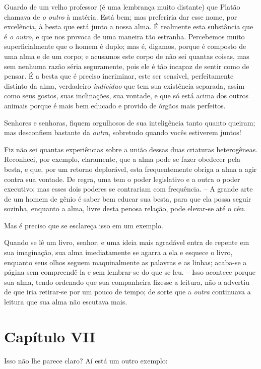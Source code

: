  Guardo de um velho professor (é uma lembrança muito distante) que
Platão chamava de \textit{o outro} à matéria. Está bem; mas preferiria
dar esse nome, por excelência, à besta que está junto a nossa alma. É
realmente esta substância que é \textit{o outro}, e que nos provoca de
uma maneira tão estranha. Percebemos muito superficialmente que o homem
é duplo; mas é, digamos, porque é composto de uma alma e de um corpo; e
acusamos este corpo de não sei quantas coisas, mas sem nenhuma razão
séria seguramente, pois ele é tão incapaz de sentir como de pensar. É a
besta que é preciso incriminar, este ser sensível, perfeitamente
distinto da alma, verdadeiro \textit{indivíduo} que tem sua existência
separada, assim como seus gostos, suas inclinações, sua vontade, e que
só está acima dos outros animais porque é mais bem educado e provido de
órgãos mais perfeitos.

 Senhores e senhoras, fiquem orgulhosos de sua inteligência tanto quanto
queiram; mas desconfiem bastante da\textit{ outra}, sobretudo quando
vocês estiverem juntos!

 Fiz não sei quantas experiências sobre a união dessas duas criaturas
heterogêneas. Reconheci, por exemplo, claramente, que a alma pode se
fazer obedecer pela besta, e que, por um retorno deplorável, esta
frequentemente obriga a alma a agir contra sua vontade. De regra, uma
tem o poder legislativo e a outra o poder executivo; mas esses dois
poderes se contrariam com frequência. -- A grande arte de um homem de
gênio é saber bem educar sua besta, para que ela possa seguir sozinha,
enquanto a alma, livre desta penosa relação, pode elevar-se até o céu. 

 Mas é preciso que se esclareça isso em um exemplo.

 Quando se lê um livro, senhor, e uma ideia mais agradável entra de
repente em sua imaginação, sua alma imediatamente se agarra a ela e
esquece o livro, enquanto seus olhos seguem maquinalmente as palavras e
as linhas; acaba-se a página sem compreendê-la e sem lembrar-se do que
se leu. -- Isso acontece porque sua alma, tendo ordenado que sua
companheira fizesse a leitura, não a advertiu de que iria retirar-se
por um pouco de tempo; de sorte que a \textit{outra} continuava a
leitura que sua alma não escutava mais.

\section*{Capítulo VII}

 Isso não lhe parece claro? Aí está um outro exemplo:

